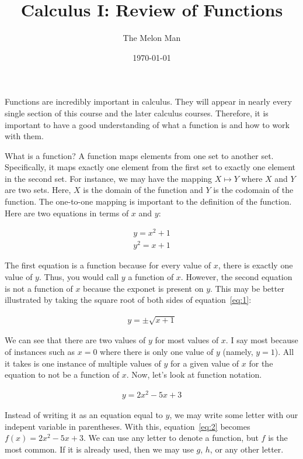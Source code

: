 \documentclass[12pt]{article}
\title{Calculus I: Review of Functions}
\author{The Melon Man}
\date{\today}
\begin{document}
\maketitle

Functions are incredibly important in calculus.
They will appear in nearly every single section of this course and the later calculus courses.
Therefore, it is important to have a good understanding of what a function is and how to work with them.

What is a function?
A function maps elements from one set to another set.
Specifically, it maps exactly one element from the first set to exactly one element in the second set.
For instance, we may have the mapping $X \mapsto Y$ where $X$ and $Y$ are two sets.
Here, $X$ is the domain of the function and $Y$ is the codomain of the function.
The one-to-one mapping is important to the definition of the function.
Here are two equations in terms of $x$ and $y$:

\begin{align}
    y = x^2 + 1 \\
    y^2 = x + 1 \label{eq:1}
\end{align}

The first equation is a function because for every value of $x$, there is exactly one value of $y$.
Thus, you would call $y$ a function of $x$.
However, the second equation is not a function of $x$ because the exponet is present on $y$.
This may be better illustrated by taking the square root of both sides of equation~\eqref{eq:1}:

\begin{align*}
    y = \pm \sqrt{x + 1}
\end{align*}

We can see that there are two values of $y$ for most values of $x$.
I say most because of instances such as $x = 0$ where there is only one value of $y$ (namely, $y = 1$).
All it takes is one instance of multiple values of $y$ for a given value of $x$ for the equation to not be a function of $x$.
Now, let's look at function notation.

\begin{align}
    \label{eq:2} y = 2x^2-5x+3
\end{align}

Instead of writing it as an equation equal to $y$, we may write some letter with our indepent variable in parentheses.
With this, equation~\eqref{eq:2} becomes $f(x) = 2x^2-5x+3$.
We can use any letter to denote a function, but $f$ is the most common.
If it is already used, then we may use $g$, $h$, or any other letter.
\end{document}
